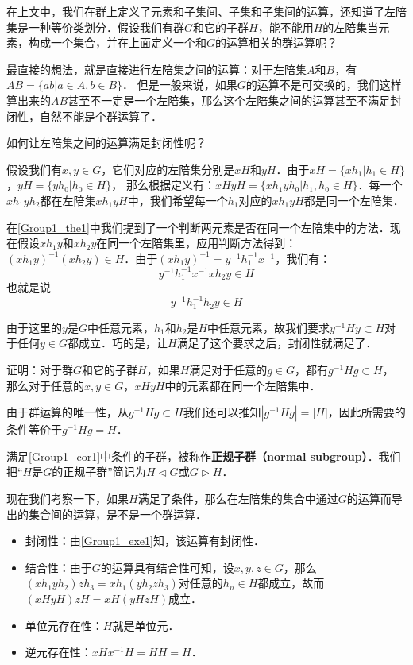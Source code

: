 在上文中，我们在群上定义了元素和子集间、子集和子集间的运算，还知道了左陪集是一种等价类划分．假设我们有群$G$和它的子群$H$，能不能用$H$的左陪集当元素，构成一个集合，并在上面定义一个和$G$的运算相关的群运算呢？

最直接的想法，就是直接进行左陪集之间的运算：对于左陪集$A$和$B$，有$AB=\{ab|a\in A, b\in B\}$． 但是一般来说，如果$G$的运算不是可交换的，我们这样算出来的$AB$甚至不一定是一个左陪集，那么这个左陪集之间的运算甚至不满足封闭性，自然不能是个群运算了．

如何让左陪集之间的运算满足封闭性呢？

假设我们有$x, y\in G$，它们对应的左陪集分别是$xH$和$yH$．由于$xH=\{xh_1|h_1\in H\}$，$yH=\{yh_0|h_0\in H\}$， 那么根据定义有：$xHyH=\{xh_1yh_0|h_1, h_0\in H\}$．每一个$xh_1yh_2$都在左陪集$xh_1yH$中，我们希望每一个$h_1$对应的$xh_1yH$都是同一个左陪集．

在\autoref{Group1_the1}中我们提到了一个判断两元素是否在同一个左陪集中的方法．现在假设$xh_1y$和$xh_2y$在同一个左陪集里，应用判断方法得到：$(xh_1y)^{-1}(xh_2y)\in H$．由于$(xh_1y)^{-1}=y^{-1}h_1^{-1}x^{-1}$，我们有：$$y^{-1}h_1^{-1}x^{-1}xh_2y\in H$$
也就是说$$y^{-1}h^{-1}_1h_2y\in H$$

由于这里的$y$是$G$中任意元素，$h_1$和$h_2$是$H$中任意元素，故我们要求$y^{-1}Hy\subset H$对于任何$y\in G$都成立．巧的是，让$H$满足了这个要求之后，封闭性就满足了．

\begin{exercise}{}\label{Group1_exe1}
证明：对于群$G$和它的子群$H$，如果$H$满足对于任意的$g\in G$，都有$g^{-1}Hg\subset H$， 那么对于任意的$x, y\in G$，$xHyH$中的元素都在同一个左陪集中．
\end{exercise}

\begin{corollary}{}\label{Group1_cor1}
由于群运算的唯一性，从$g^{-1}Hg\subset H$我们还可以推知$|g^{-1}Hg|=|H|$，因此所需要的条件等价于$g^{-1}Hg=H$．
\end{corollary}

满足\autoref{Group1_cor1}中条件的子群，被称作\textbf{正规子群（normal subgroup）}．我们把“$H$是$G$的正规子群”简记为$H\triangleleft G$或$G\triangleright H$．

现在我们考察一下，如果$H$满足了条件，那么在左陪集的集合中通过$G$的运算而导出的集合间的运算，是不是一个群运算．
\begin{itemize}
\item 封闭性：由\autoref{Group1_exe1}知，该运算有封闭性．
\item 结合性：由于$G$的运算具有结合性可知，设$x, y, z\in G$，那么$(xh_1yh_2)zh_3=xh_1(yh_2zh_3)$对任意的$h_n\in H$都成立，故而$(xHyH)zH=xH(yHzH)$成立．
\item 单位元存在性：$H$就是单位元．
\item 逆元存在性：$xHx^{-1}H=HH=H$．
\end{itemize}

